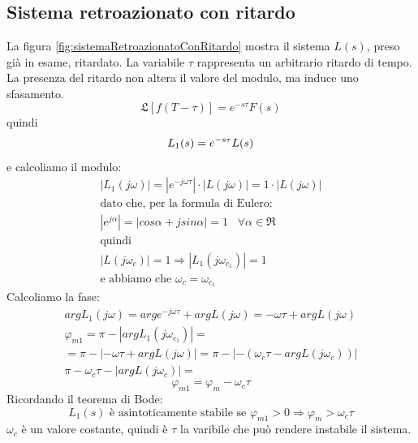 \documentclass[a4paper]{report}
\begin{document}
\subsection{Sistema retroazionato con ritardo}

La figura \ref{fig:sistemaRetroazionatoConRitardo} mostra il sistema
$L(s)$, preso gi\`a in esame, ritardato. La variabile $\tau$
rappresenta un arbitrario ritardo di tempo. La presenza del ritardo
non altera il valore del modulo, ma induce uno sfasamento.
\[
\mathfrak{L}[f(T - \tau)] = e^{-s \tau} F(s)
\]
quindi
\[
L_1(s) = e^{-s \tau} L(s)\\
\]
e calcoliamo il modulo:
\[
\begin{array}{l}
  |L_1(j \omega)| = |e^{-j \omega \tau}| \cdot |L(j \omega)| = 1 \cdot
  |L(j \omega)|\\
  \textrm{dato che, per la formula di Eulero:}\\
  |e^{j \alpha}| = |cos \alpha + j sin \alpha| = 1 \;\;\; \forall \alpha \in
  \mathfrak{R}\\
  \textrm{quindi}\\
  |L(j \omega_c)| = 1 \Rightarrow |L_1(j \omega_{c_{1}})| = 1\\
  \textrm{e abbiamo che } \omega_c = \omega_{c_{1}}
\end{array}
\]
Calcoliamo la fase:
\[
\begin{array}{l}
  arg L_1(j \omega) = arg e^{-j \omega \tau} + arg L(j \omega) =
  -\omega \tau + arg L(j \omega)\\
  \varphi_{m1} = \pi - |arg L_1(j \omega_{c_{1}})| = \\
  = \pi - | - \omega \tau + arg L(j \omega)| = \pi - | - (\omega_c \tau
  - arg L(j \omega_c))|\\
  \pi - \omega_c \tau - |arg L(j \omega_c)| =
\end{array}
\]
\begin{equation}
  \varphi_{m1} = \varphi_m - \omega_c \tau
\end{equation}
Ricordando il teorema di Bode:
\[
L_1(s) \textrm{ \`e asintoticamente stabile se } \varphi_{m1} > 0
\Rightarrow \varphi_m > \omega_c \tau
\]
$\omega_c$ \`e un valore costante, quindi \`e $\tau$ la varibile che
pu\`o rendere instabile il sistema.
\end{document}
